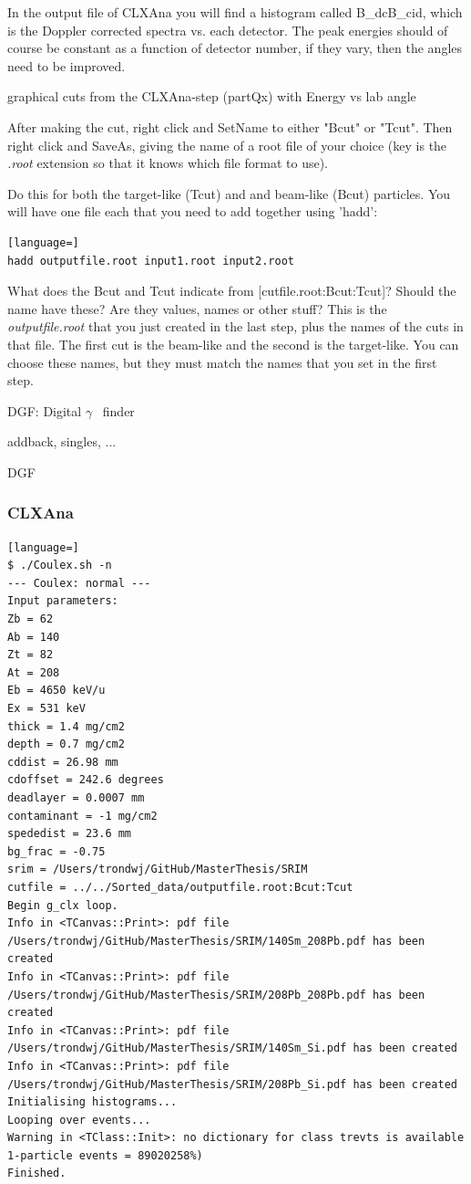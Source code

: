 \documentclass[twoside,english]{uiofysmaster/uiofysmaster}
\newcommand{\ga}{$\gamma$}
\begin{document}
In the output file of CLXAna you will find a histogram called B\_dcB\_cid, which is the Doppler corrected spectra vs. each detector. The peak energies should of course be constant as a function of detector number, if they vary, then the angles need to be improved.

graphical cuts from the CLXAna-step (partQx) with Energy vs lab angle

After making the cut, right click and SetName to either "Bcut" or "Tcut". Then right click and SaveAs, giving the name of a root file of your choice (key is the \textit{.root} extension so that it knows which file format to use).

Do this for both the target-like (Tcut) and and beam-like (Bcut) particles. You will have one file each that you need to add together using 'hadd':

\begin{lstlisting}[language=]
hadd outputfile.root input1.root input2.root
\end{lstlisting}

What does the Bcut and Tcut indicate from [cutfile.root:Bcut:Tcut]?
Should the name have these? Are they values, names or other stuff?
This is the \textit{outputfile.root} that you just created in the last step, plus the names of the cuts in that file. The first cut is the beam-like and the second is the target-like. You can choose these names, but they must match the names that you set in the first step.

DGF: Digital \ga~ finder

addback, singles, ...


\begin{table}[ht] 
	\centering 
	\caption{DGF}
	
	\label{tab:DGF}
\end{table}


\subsubsection{CLXAna}
\begin{lstlisting}[language=]
$ ./Coulex.sh -n
--- Coulex: normal ---
Input parameters:
Zb = 62
Ab = 140
Zt = 82
At = 208
Eb = 4650 keV/u
Ex = 531 keV
thick = 1.4 mg/cm2
depth = 0.7 mg/cm2
cddist = 26.98 mm
cdoffset = 242.6 degrees
deadlayer = 0.0007 mm
contaminant = -1 mg/cm2
spededist = 23.6 mm
bg_frac = -0.75
srim = /Users/trondwj/GitHub/MasterThesis/SRIM
cutfile = ../../Sorted_data/outputfile.root:Bcut:Tcut
Begin g_clx loop.
Info in <TCanvas::Print>: pdf file /Users/trondwj/GitHub/MasterThesis/SRIM/140Sm_208Pb.pdf has been created
Info in <TCanvas::Print>: pdf file /Users/trondwj/GitHub/MasterThesis/SRIM/208Pb_208Pb.pdf has been created
Info in <TCanvas::Print>: pdf file /Users/trondwj/GitHub/MasterThesis/SRIM/140Sm_Si.pdf has been created
Info in <TCanvas::Print>: pdf file /Users/trondwj/GitHub/MasterThesis/SRIM/208Pb_Si.pdf has been created
Initialising histograms...
Looping over events...
Warning in <TClass::Init>: no dictionary for class trevts is available
1-particle events = 89020258%)    
Finished.
\end{lstlisting}
\end{document}
